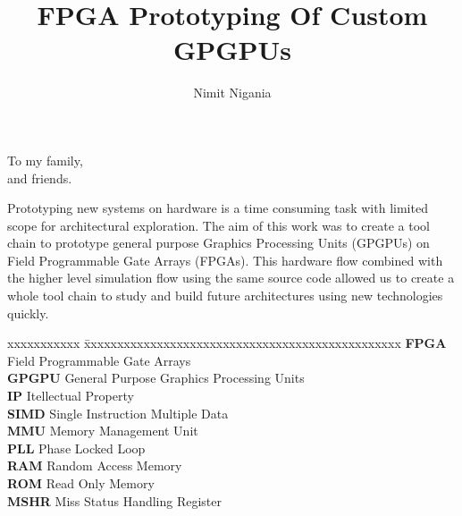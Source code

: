 \documentclass[12pt]{gatech-thesis}
\title{FPGA Prototyping Of Custom GPGPUs} %
\author{Nimit Nigania}
\begin{document}

\begin{preliminary}
\begin{dedication}
\null\vfil
{\large
\begin{center}
To my family,\\\vspace{12pt}
and friends.\\\vspace{12pt}

\end{center}}
\vfil\null
\end{dedication}

\begin{preface}
Prototyping new systems on hardware is a time consuming task with limited scope for architectural exploration. The aim of this work was to create a tool chain to prototype general purpose Graphics Processing Units (GPGPUs) on Field Programmable Gate Arrays (FPGAs). This hardware flow combined with the higher level simulation flow using the same source code allowed us to create a whole tool chain to study and build future architectures using new technologies quickly.
\end{preface}

\begin{acknowledgements}

\end{acknowledgements}
\contents
\end{preliminary}
\pagebreak
\noindent
\begin{tabbing}
xxxxxxxxxxx \= xxxxxxxxxxxxxxxxxxxxxxxxxxxxxxxxxxxxxxxxxxxxxxxx \kill
\textbf{FPGA}   \> Field Programmable Gate Arrays \\
\textbf{GPGPU}  \> General Purpose Graphics Processing Units\\
\textbf{IP}  \> Itellectual Property\\
\textbf{SIMD}  \> Single Instruction Multiple Data\\
\textbf{MMU}  \> Memory Management Unit\\
\textbf{PLL}  \> Phase Locked Loop\\
\textbf{RAM}  \> Random Access Memory\\
\textbf{ROM}  \> Read Only Memory\\
\textbf{MSHR}  \> Miss Status Handling Register\\
\end{tabbing}
\end{document}
